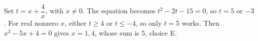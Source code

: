 Set $t=x+\dfrac{4}{x}$, with $x\ne0$. The equation becomes $t^2-2t-15=0$, so $t=5$ or $-3$. For real nonzero $x$, either $t\ge4$ or $t\le-4$, so only $t=5$ works. Then $x^2-5x+4=0$ gives $x=1,4$, whose sum is $\boxed{5}$, choice E.
